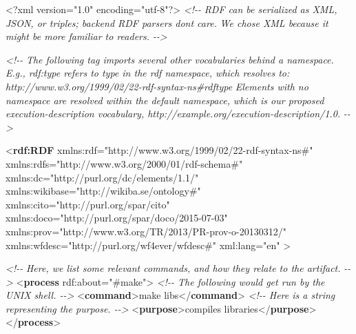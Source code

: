 \documentclass[manuscript,authordraft]{acmart}
\newenvironment{Shaded}{}{}
\newcommand{\CommentTok}[1]{\textcolor[rgb]{0.38,0.63,0.69}{\textit{#1}}}
\newcommand{\FunctionTok}[1]{\textcolor[rgb]{0.02,0.16,0.49}{#1}}
\newcommand{\KeywordTok}[1]{\textcolor[rgb]{0.00,0.44,0.13}{\textbf{#1}}}
\newcommand{\NormalTok}[1]{#1}
\newcommand{\OtherTok}[1]{\textcolor[rgb]{0.00,0.44,0.13}{#1}}
\newcommand{\StringTok}[1]{\textcolor[rgb]{0.25,0.44,0.63}{#1}}
\begin{document}
\begin{Shaded}
\begin{Highlighting}[]
\FunctionTok{\textless{}?xml}\OtherTok{ version=}\StringTok{"1.0"}\OtherTok{ encoding=}\StringTok{"utf{-}8"}\FunctionTok{?\textgreater{}}
\CommentTok{\textless{}!{-}{-}}
\CommentTok{RDF can be serialized as XML, JSON, or triples; backend RDF parsers don\textquotesingle{}t care.}
\CommentTok{We chose XML because it might be more familiar to readers.}
\CommentTok{{-}{-}\textgreater{}}

\CommentTok{\textless{}!{-}{-}}
\CommentTok{The following tag imports several other vocabularies behind a namespace.}
\CommentTok{E.g., \textasciigrave{}rdf:type\textasciigrave{} refers to \textasciigrave{}type\textasciigrave{} in the \textasciigrave{}rdf\textasciigrave{} namespace, which resolves to:}
\CommentTok{http://www.w3.org/1999/02/22{-}rdf{-}syntax{-}ns\#rdftype}
\CommentTok{Elements with no namespace are resolved within the default namespace,}
\CommentTok{which is our proposed execution{-}description vocabulary, http://example.org/execution{-}description/1.0.}
\CommentTok{{-}{-}\textgreater{}}

\NormalTok{\textless{}}\KeywordTok{rdf:RDF}\OtherTok{ xmlns:rdf=}\StringTok{"http://www.w3.org/1999/02/22{-}rdf{-}syntax{-}ns\#"}
\OtherTok{         xmlns:rdfs=}\StringTok{"http://www.w3.org/2000/01/rdf{-}schema\#"}
\OtherTok{         xmlns:dc=}\StringTok{"http://purl.org/dc/elements/1.1/"}
\OtherTok{         xmlns:wikibase=}\StringTok{"http://wikiba.se/ontology\#"}
\OtherTok{         xmlns:cito=}\StringTok{"http://purl.org/spar/cito"}
\OtherTok{         xmlns:doco=}\StringTok{"http://purl.org/spar/doco/2015{-}07{-}03"}
\OtherTok{         xmlns:prov=}\StringTok{"http://www.w3.org/TR/2013/PR{-}prov{-}o{-}20130312/"}
\OtherTok{         xmlns:wfdesc=}\StringTok{"http://purl.org/wf4ever/wfdesc\#"}
\OtherTok{         xml:lang=}\StringTok{"en"}
\NormalTok{         \textgreater{}}

  \CommentTok{\textless{}!{-}{-}}
\CommentTok{  Here, we list some relevant commands, and how they relate to the artifact.}
\CommentTok{  {-}{-}\textgreater{}}
\NormalTok{  \textless{}}\KeywordTok{process}\OtherTok{ rdf:about=}\StringTok{"\#make"}\NormalTok{\textgreater{}}
    \CommentTok{\textless{}!{-}{-} The following would get run by the UNIX shell. {-}{-}\textgreater{}}
\NormalTok{    \textless{}}\KeywordTok{command}\NormalTok{\textgreater{}make libs\textless{}/}\KeywordTok{command}\NormalTok{\textgreater{}}
    \CommentTok{\textless{}!{-}{-} Here is a string representing the purpose. {-}{-}\textgreater{}}
\NormalTok{    \textless{}}\KeywordTok{purpose}\NormalTok{\textgreater{}compiles libraries\textless{}/}\KeywordTok{purpose}\NormalTok{\textgreater{}}
\NormalTok{  \textless{}/}\KeywordTok{process}\NormalTok{\textgreater{}}


\end{Highlighting}
\end{Shaded}
\end{document}
